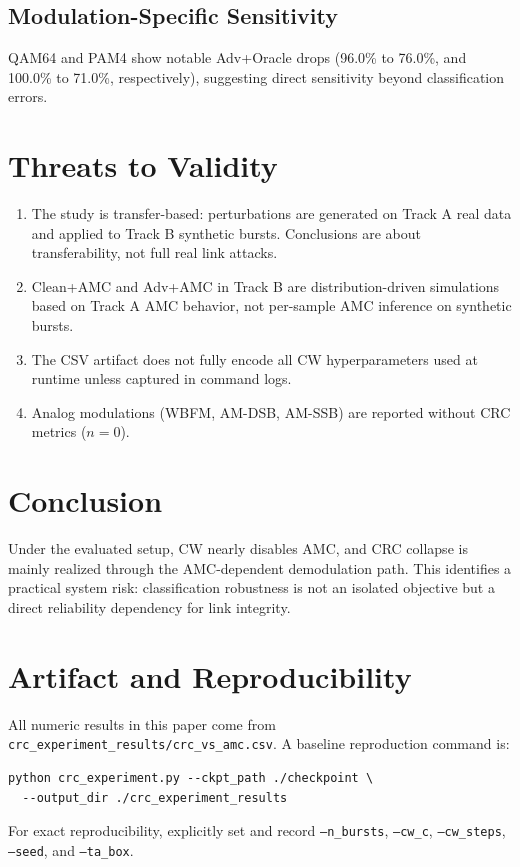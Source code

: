 \subsection{Modulation-Specific Sensitivity}
QAM64 and PAM4 show notable Adv+Oracle drops (96.0\% to 76.0\%, and 100.0\% to 71.0\%,
respectively), suggesting direct sensitivity beyond classification errors.

\section{Threats to Validity}
\begin{enumerate}
\item The study is transfer-based: perturbations are generated on Track A real data and applied
to Track B synthetic bursts. Conclusions are about transferability, not full real link attacks.
\item Clean+AMC and Adv+AMC in Track B are distribution-driven simulations based on Track A AMC
behavior, not per-sample AMC inference on synthetic bursts.
\item The CSV artifact does not fully encode all CW hyperparameters used at runtime unless
captured in command logs.
\item Analog modulations (WBFM, AM-DSB, AM-SSB) are reported without CRC metrics ($n=0$).
\end{enumerate}

\section{Conclusion}
Under the evaluated setup, CW nearly disables AMC, and CRC collapse is mainly realized through
the AMC-dependent demodulation path. This identifies a practical system risk: classification
robustness is not an isolated objective but a direct reliability dependency for link integrity.

\section*{Artifact and Reproducibility}
All numeric results in this paper come from
\texttt{crc\_experiment\_results/crc\_vs\_amc.csv}. A baseline reproduction command is:
\begin{verbatim}
python crc_experiment.py --ckpt_path ./checkpoint \
  --output_dir ./crc_experiment_results
\end{verbatim}
For exact reproducibility, explicitly set and record
\texttt{--n\_bursts}, \texttt{--cw\_c}, \texttt{--cw\_steps}, \texttt{--seed}, and
\texttt{--ta\_box}.
